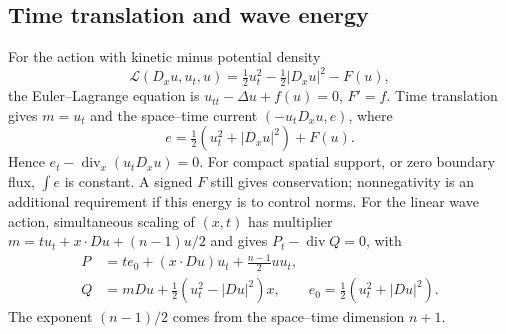 \Needspace{45mm}
\subsection{Time translation and wave energy}
For the action with kinetic minus potential density
\[
 \mathcal L(D_xu,u_t,u)=\tfrac12u_t^2-\tfrac12|D_xu|^2-F(u),
\]
the Euler--Lagrange equation is $u_{tt}-\Delta u+f(u)=0$, $F'=f$.
Time translation gives $m=u_t$ and the space--time current
$(-u_tD_xu,e)$, where
\[
 e=\tfrac12(u_t^2+|D_xu|^2)+F(u).
\]
Hence $e_t-\operatorname{div}_x(u_tD_xu)=0$.
For compact spatial support, or zero boundary flux, $\int e$ is constant.
A signed $F$ still gives conservation; nonnegativity is an additional
requirement if this energy is to control norms.
For the linear wave action, simultaneous scaling of $(x,t)$ has multiplier
$m=tu_t+x\cdot Du+(n-1)u/2$ and gives $P_t-\operatorname{div}Q=0$, with
\[
 \begin{split}
 P&=t e_0+(x\cdot Du)u_t+\tfrac{n-1}{2}uu_t,\\
 Q&=mDu+\tfrac12(u_t^2-|Du|^2)x,\qquad
 e_0=\tfrac12(u_t^2+|Du|^2).
 \end{split}
\]
The exponent $(n-1)/2$ comes from the space--time dimension $n+1$.

\Needspace{45mm}
